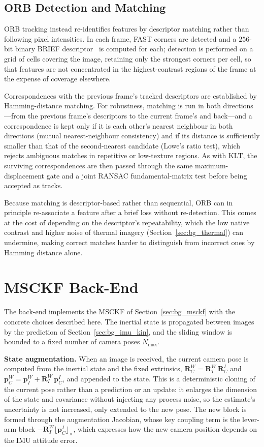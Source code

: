 \subsection{ORB Detection and Matching}
\label{sec:m_orb}
ORB tracking instead re-identifies features by descriptor matching rather than following pixel intensities. In each frame, FAST corners are detected and a $256$-bit binary BRIEF descriptor~\cite{Rublee_2011} is computed for each; detection is performed on a grid of cells covering the image, retaining only the strongest corners per cell, so that features are not concentrated in the highest-contrast regions of the frame at the expense of coverage elsewhere.

Correspondences with the previous frame's tracked descriptors are established by Hamming-distance matching. For robustness, matching is run in both directions---from the previous frame's descriptors to the current frame's and back---and a correspondence is kept only if it is each other's nearest neighbour in both directions (mutual nearest-neighbour consistency) and if its distance is sufficiently smaller than that of the second-nearest candidate (Lowe's ratio test), which rejects ambiguous matches in repetitive or low-texture regions. As with KLT, the surviving correspondences are then passed through the same maximum-displacement gate and a joint RANSAC fundamental-matrix test before being accepted as tracks.

Because matching is descriptor-based rather than sequential, ORB can in principle re-associate a feature after a brief loss without re-detection. This comes at the cost of depending on the descriptor's repeatability, which the low native contrast and higher noise of thermal imagery (Section~\ref{sec:bg_thermal}) can undermine, making correct matches harder to distinguish from incorrect ones by Hamming distance alone.

\section{MSCKF Back-End}
\label{sec:m_backend}
The back-end implements the MSCKF of Section~\ref{sec:bg_msckf} with the concrete choices described here. The inertial state is propagated between images by the prediction of Section~\ref{sec:bg_imu_kin}, and the sliding window is bounded to a fixed number of camera poses $N_{\max}$.

\textbf{State augmentation.} When an image is received, the current camera pose is computed from the inertial state and the fixed extrinsics, $\mathbf{R}_{C}^{W} = \mathbf{R}_{I}^{W}\,\mathbf{R}_{C}^{I}$ and $\mathbf{p}_{C}^{W} = \mathbf{p}_{I}^{W} + \mathbf{R}_{I}^{W}\,\mathbf{p}_{C}^{I}$, and appended to the state. This is a deterministic cloning of the current pose rather than a prediction or an update: it enlarges the dimension of the state and covariance without injecting any process noise, so the estimate's uncertainty is not increased, only extended to the new pose. The new block is formed through the augmentation Jacobian, whose key coupling term is the lever-arm block $-\mathbf{R}_{I}^{W}\lfloor\mathbf{p}_{C}^{I}\rfloor_{\times}$, which expresses how the new camera position depends on the IMU attitude error.

